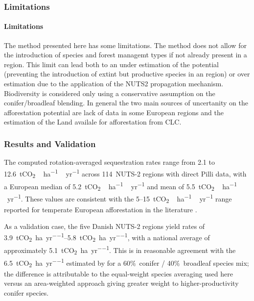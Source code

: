 \documentclass[12pt, a4paper]{article}
\begin{document}
\subsubsection{Limitations}
\label{sec:Limitations}

\paragraph{Limitations}
The method presented here has some limitations. The method does not allow for the introduction of species and forest managemt types if not already present in a region. This limit can lead both to an under estimation of the potential (preventing the introduction of extint but productive species in an region) or over estimation due to the application of the NUTS2 propagation mechanism. Biodiversity is considered only using a conservative assumption on the conifer/broadleaf blending. In general the two main sources of uncertanity on the afforestation potential are lack of data in some European regions and the estimation of the Land availale for afforestation from CLC.



\subsubsection{Results and Validation}
\label{sec:affo_results}

The computed rotation-averaged sequestration rates range from
2.1 to 12.6~\si{tCO_2\,ha^{-1}\,yr^{-1}}
across 114~NUTS-2 regions with
direct Pilli data, with a European median of 5.2~\si{tCO_2\,ha^{-1}\,yr^{-1}}
and mean of 5.5~\si{tCO_2\,ha^{-1}\,yr^{-1}}. These values are consistent with
the 5--15~\si{tCO_2\,ha^{-1}\,yr^{-1}} range reported for temperate European
afforestation in the literature \citep{Nabuurs2013, Avitabile2024}.

As a validation case, the five Danish NUTS-2 regions yield rates of
\SIrange{3.9}{5.8}{tCO_2\per ha\per yr}, with a national average of
approximately \SI{5.1}{tCO_2\per ha\per yr}. This is in reasonable
agreement with the \SI{6.5}{tCO_2\per ha\per yr} estimated by
\citet{Fernandes2026} for a 60\%~conifer / 40\%~broadleaf species mix;
the difference is attributable to the equal-weight species averaging used
here versus an area-weighted approach giving greater weight to
higher-productivity conifer species.
\end{document}
